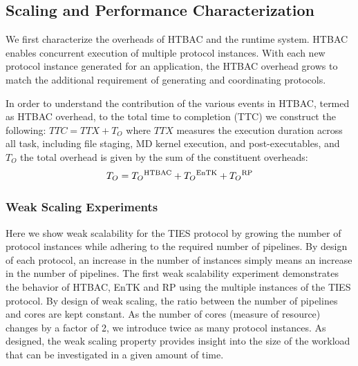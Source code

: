 \subsection{Scaling and Performance Characterization}

We first characterize the overheads of HTBAC and the runtime system. HTBAC
enables concurrent execution of multiple protocol instances. With each new
protocol instance generated for an application, the HTBAC overhead grows to
match the additional requirement of generating and coordinating protocols.

In order to understand the contribution of the various events in HTBAC, termed
as HTBAC overhead, to the total time to completion (TTC) we construct the
following: $TTC = TTX + T_{O}$ where
 \(TTX\) measures the execution duration across all task, including file
 staging, MD kernel execution, and post-executables, and $T_{O}$ the total
overhead is given by the sum of the constituent overheads: $$T_{O} =
T_{O}\textsuperscript{HTBAC} + T_{O}\textsuperscript{EnTK} +
T_{O}\textsuperscript{RP}$$









\subsubsection{Weak Scaling Experiments}

Here we show weak scalability for the TIES protocol by growing the number of
protocol instances while adhering to the required number of pipelines. By
design of each protocol, an increase in the number of instances simply means
an increase in the number of pipelines. The first weak scalability experiment
demonstrates the behavior of HTBAC, EnTK and RP using the multiple instances
of the TIES protocol. By design of weak scaling, the ratio between the number
of pipelines and cores are kept constant. As the number of cores (measure of
resource) changes by a factor of 2, we introduce twice as many protocol
instances. As designed, the weak scaling property provides insight into the
size of the workload that can be investigated in a given amount of time.

